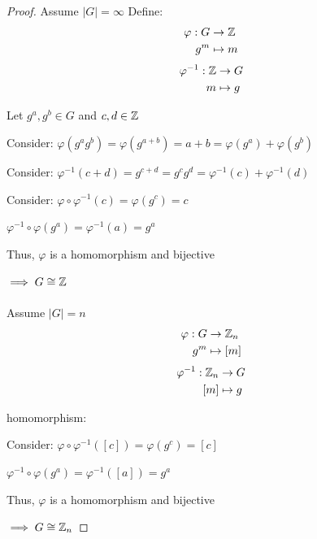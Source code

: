 \begin{proof}
    Assume $|G|=\infty$ Define:
    \begin{align*}
        \varphi: G &\rightarrow \mathbb{Z}\\
        g^m &\mapsto m
    \end{align*}
    \begin{align*}
        \varphi^{-1}: \mathbb{Z} &\rightarrow G\\
        m &\mapsto g
    \end{align*}

    Let $g^a,g^b \in G$ and $c,d \in \mathbb{Z}$

    Consider: $\varphi(g^ag^b)=\varphi(g^{a+b})=a+b=\varphi(g^a)+\varphi(g^b)$
    
    Consider: $\varphi^{-1}(c+d)=g^{c+d}=g^cg^d=\varphi^{-1}(c)+\varphi^{-1}(d)$

    Consider: $\varphi\circ\varphi^{-1}(c)=\varphi(g^c)=c$

    $\varphi^{-1}\circ\varphi(g^a)=\varphi^{-1}(a)=g^a$

    Thus, $\varphi$ is a homomorphism and bijective

    $\implies G \cong \mathbb{Z}$\\\\

    Assume $|G|=n$
    \begin{align*}
        \varphi: G &\rightarrow \mathbb{Z}_n\\
        g^m &\mapsto [m]
    \end{align*}
    \begin{align*}
        \varphi^{-1}: \mathbb{Z}_n &\rightarrow G\\
        [m] &\mapsto g
    \end{align*}

    homomorphism: \checkmark

    Consider: $\varphi\circ\varphi^{-1}([c])=\varphi(g^c)=[c]$

    $\varphi^{-1}\circ\varphi(g^a)=\varphi^{-1}([a])=g^a$

    Thus, $\varphi$ is a homomorphism and bijective

    $\implies G \cong \mathbb{Z}_n$
\end{proof}


